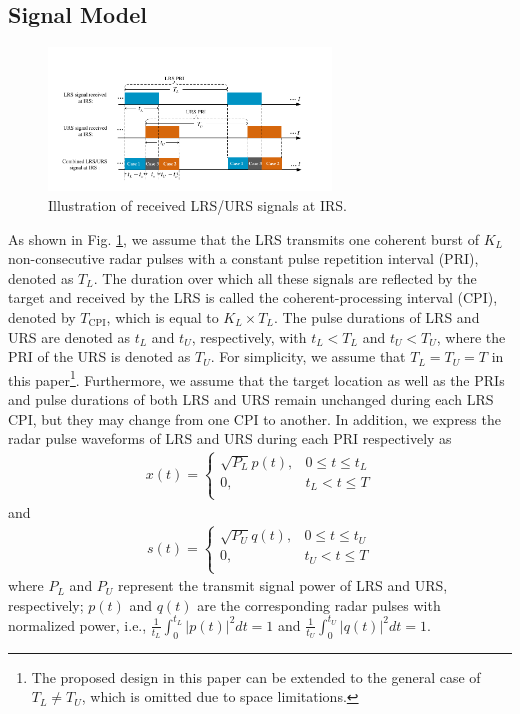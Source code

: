 \documentclass[10pt,final,doublecolumn]{IEEEtran}
\begin{document}
\subsection{Signal Model}
\begin{figure}[t!]
\setlength{\abovecaptionskip}{-0.cm}
\setlength{\belowcaptionskip}{0.cm}
  \centering
\includegraphics[width=0.67\textwidth]{pulse.pdf}
\caption{Illustration of received LRS/URS signals at IRS.}
\label{pulse}
\end{figure}
As shown in Fig. \ref{pulse}, we assume that the LRS transmits one coherent burst of $K_L$ non-consecutive radar pulses with a constant pulse repetition interval (PRI), denoted as $T_L$. The duration over which all these signals are reflected by the target and received by the LRS is called the coherent-processing interval (CPI), denoted by $T_{\mathrm{CPI}}$, which is equal to $K_L\times T_L$. The pulse durations of LRS and URS are denoted as $t_L$ and $t_U$, respectively, with $t_L<T_L$ and $t_U<T_U$, where the PRI of the URS is denoted as $T_U$.
For simplicity, we assume that $T_L=T_U=T$ in this paper\footnote{The proposed design in this paper can be extended to the general case of $T_L\neq T_U$, which is omitted due to space limitations.}. Furthermore, we assume that the target location as well as the PRIs and pulse durations of both LRS and URS remain unchanged during each LRS CPI, but they may change from one CPI to another.
In addition, we express the radar pulse waveforms of LRS and URS during  each PRI respectively as
\begin{align}\label{wl}
x(t)=\begin{cases}
\sqrt{P_{L}}p(t), & 0\leq t\leq t_L \\
0, &  t_L< t\leq T \\
\end{cases}
\end{align}
and
\begin{align}\label{wl2}
s(t)=\begin{cases}
\sqrt{P_{U}}q(t), & 0\leq t\leq t_U \\
0, &  t_U< t\leq T \\
\end{cases}
\end{align}
where $P_{L}$ and $P_{U}$ represent the transmit signal power of LRS and URS, respectively; $p(t)$ and $q(t)$ are the corresponding
radar pulses with normalized power, i.e., $\frac{1}{t_L}\int_{0}^{t_L}|p(t)|^2dt=1$ and $\frac{1}{t_U}\int_{0}^{t_U}|q(t)|^2dt=1$.
\end{document}
